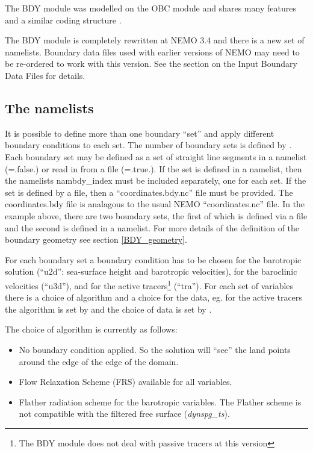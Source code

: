 \documentclass[NEMO_book]{subfiles}
\begin{document}
The BDY module was modelled on the OBC module and shares many features
and a similar coding structure \citep{Chanut2005}.

The BDY module is completely rewritten at NEMO 3.4 and there is a new
set of namelists. Boundary data files used with earlier versions of
NEMO may need to be re-ordered to work with this version. See the
section on the Input Boundary Data Files for details.

\subsection{The namelists}
\label{BDY_namelist}

It is possible to define more than one boundary ``set'' and apply
different boundary conditions to each set. The number of boundary
sets is defined by .  Each boundary set may be defined
as a set of straight line segments in a namelist
(=.false.) or read in from a file
(=.true.). If the set is defined in a namelist,
then the namelists nambdy\_index must be included separately, one for
each set. If the set is defined by a file, then a
``coordinates.bdy.nc'' file must be provided. The coordinates.bdy file
is analagous to the usual NEMO ``coordinates.nc'' file. In the example
above, there are two boundary sets, the first of which is defined via
a file and the second is defined in a namelist. For more details of
the definition of the boundary geometry see section
\ref{BDY_geometry}.

For each boundary set a boundary
condition has to be chosen for the barotropic solution (``u2d'':
sea-surface height and barotropic velocities), for the baroclinic
velocities (``u3d''), and for the active tracers\footnote{The BDY
  module does not deal with passive tracers at this version}
(``tra''). For each set of variables there is a choice of algorithm
and a choice for the data, eg. for the active tracers the algorithm is
set by  and the choice of data is set by
. 

The choice of algorithm is currently as follows:

\mbox{}

\begin{itemize}
\item[0.] No boundary condition applied. So the solution will ``see''
  the land points around the edge of the edge of the domain.
\item[1.] Flow Relaxation Scheme (FRS) available for all variables. 
\item[2.] Flather radiation scheme for the barotropic variables. The
  Flather scheme is not compatible with the filtered free surface
  ({\it dynspg\_ts}). 
\end{itemize}
\end{document}
